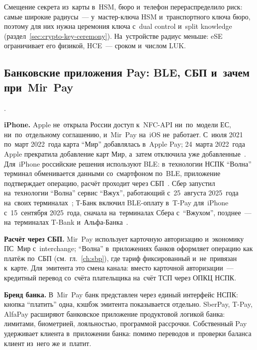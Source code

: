 Смещение секрета из~карты в~HSM, бюро и~телефон перераспределило риск: самые
широкие радиусы~--- у~мастер-ключа HSM и~транспортного ключа бюро, поэтому для
них нужна церемония ключа с~dual control и~split knowledge
(раздел~\ref{sec:crypto-key-ceremony}). На~устройстве радиус меньше: eSE
ограничивает его физикой, HCE~--- сроком и~числом LUK.

\subsection*{Банковские приложения Pay: BLE, СБП и~зачем при~Mir~Pay}\label{sec:contactless-bank-pay}

.

\textbf{iPhone.} Apple не~открыла России доступ к~NFC-API ни~по~модели ЕС,
ни~по~отдельному соглашению, и~Mir~Pay на~iOS не~работает. С~июля 2021
по~март 2022~года карта \enquote{Мир} добавлялась в~Apple Pay; 24~марта 2022~года
Apple прекратила добавление карт Мир, а~затем отключила уже
добавленные~\cite{kommersant-applepay-mir-2022}. Для~iPhone российские
решения используют BLE: в~технологии НСПК \enquote{Волна} терминал обменивается данными
со~смартфоном по~BLE, приложение подтверждает операцию, расчёт проходит через
СБП~\cite{nspk-volna-demo-2025,nspk-volna-sdk-ios}. Сбер запустил
на~технологии \enquote{Волна} сервис \enquote{Вжух}, работающий с~25~августа
2025~года на~своих терминалах~\cite{sber-vzhuh-2025,plusworld-vzhuh-2025}; Т-Банк включил BLE-оплату в~T-Pay
для~iPhone с~15~сентября 2025~года, сначала на~терминалах Сбера
с~\enquote{Вжухом}, позднее~--- на~терминалах T-Bank
и~Альфа-Банка~\cite{tbank-tpay-iphone-2025}.

\textbf{Расчёт через СБП.} Mir~Pay использует карточную авторизацию и~экономику
ПС~Мир с~interchange; \enquote{Волна}
в~приложениях банков оформляет операцию как платёж по~СБП (см.~гл.~\ref{ch:sbp}),
где тариф фиксированный и~не~привязан к~карте. Для~эмитента это смена канала:
вместо карточной авторизации~--- кредитный перевод со~счёта плательщика на~счёт
ТСП через ОПКЦ НСПК.

\textbf{Бренд банка.} В~Mir~Pay банк представлен через единый интерфейс НСПК:
кнопка \enquote{платить} одна, кэшбэк эмитента показывается отдельно. SberPay,
T-Pay, AlfaPay расширяют банковское приложение продуктовой логикой банка:
лимитами, биометрией, лояльностью, программой рассрочки. Собственный Pay удерживает клиента в~приложении банка: помимо переводов
и~проверки баланса клиент из~него же и~платит.


